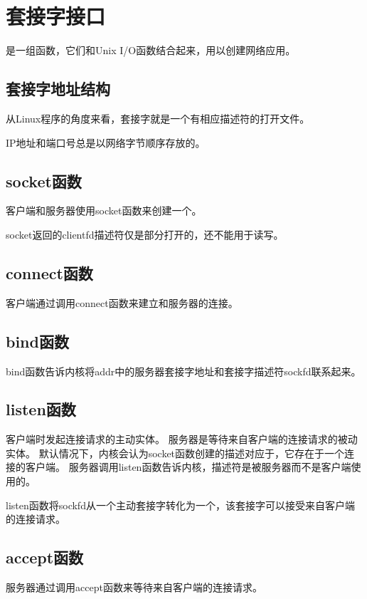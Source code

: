 
\section{套接字接口}
{
    是一组函数，它们和Unix I/O函数结合起来，用以创建网络应用。

    \subsection{套接字地址结构}
    {
        从Linux程序的角度来看，套接字就是一个有相应描述符的打开文件。

        IP地址和端口号总是以网络字节顺序存放的。
    }

    \subsection{socket函数}
    {
        客户端和服务器使用socket函数来创建一个。

        socket返回的clientfd描述符仅是部分打开的，还不能用于读写。
    }

    \subsection{connect函数}
    {
        客户端通过调用connect函数来建立和服务器的连接。
    }

    \subsection{bind函数}
    {
        bind函数告诉内核将addr中的服务器套接字地址和套接字描述符sockfd联系起来。
    }

    \subsection{listen函数}
    {
        客户端时发起连接请求的主动实体。
        服务器是等待来自客户端的连接请求的被动实体。
        默认情况下，内核会认为socket函数创建的描述对应于，它存在于一个连接的客户端。
        服务器调用listen函数告诉内核，描述符是被服务器而不是客户端使用的。

        listen函数将sockfd从一个主动套接字转化为一个，该套接字可以接受来自客户端的连接请求。
    }

    \subsection{accept函数}
    {
        服务器通过调用accept函数来等待来自客户端的连接请求。

}}
